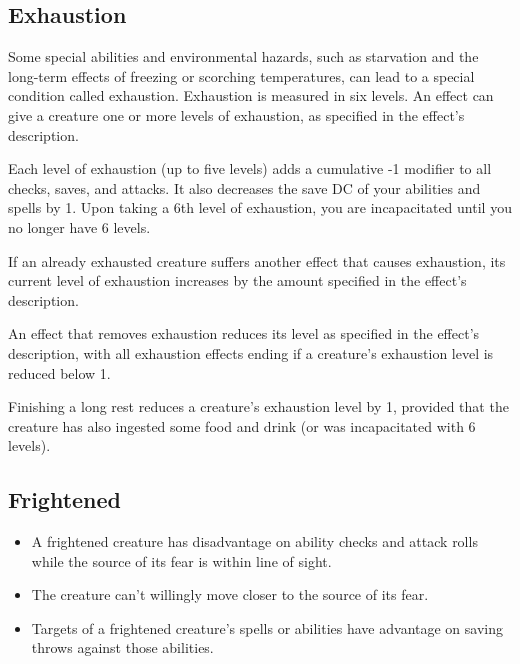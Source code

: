 \subsection{Exhaustion\label{condition:exhaustion}}

Some special abilities and environmental hazards, such as starvation and the long-term effects of freezing or scorching temperatures, can lead to a special condition called exhaustion. Exhaustion is measured in six levels. An effect can give a creature one or more levels of exhaustion, as specified in the effect's description.

Each level of exhaustion (up to five levels) adds a cumulative -1 modifier to all checks, saves, and attacks. It also decreases the save DC of your abilities and spells by 1. Upon taking a 6th level of exhaustion, you are incapacitated until you no longer have 6 levels.

If an already exhausted creature suffers another effect that causes exhaustion, its current level of exhaustion increases by the amount specified in the effect's description.

An effect that removes exhaustion reduces its level as specified in the effect's description, with all exhaustion effects ending if a creature's exhaustion level is reduced below 1.

Finishing a long rest reduces a creature's exhaustion level by 1, provided that the creature has also ingested some food and drink (or was incapacitated with 6 levels).

\subsection{Frightened\label{condition:frightened}}
\begin{itemize}
\item A frightened creature has disadvantage on ability checks and attack rolls while the source of its fear is within line of sight.
\item The creature can't willingly move closer to the source of its fear.
\item Targets of a frightened creature's spells or abilities have advantage on saving throws against those abilities.
\end{itemize}

